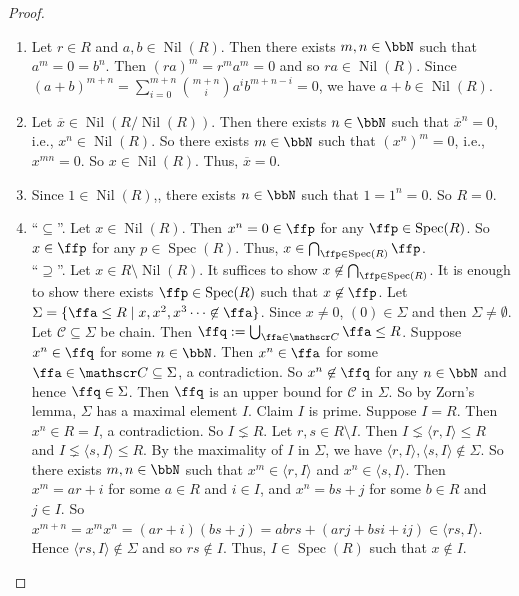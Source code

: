 \begin{proof}
    \begin{enumerate}[(1)]
        \item Let $r \in R$ and $a,b \in \operatorname{Nil}(R)$. Then there exists $m,n \in \bbN$ such that $a^m = 0 = b^n$. Then $(ra)^m = r^ma^m = 0$ and so $ra \in \operatorname{Nil}(R)$. Since $(a+b)^{m+n} = \sum_{i=0}^{m+n} \binom {m+n} i a^i b^{m+n-i} = 0$, we have $a+b \in \operatorname{Nil}(R)$.
        \item Let $\overline x \in \operatorname{Nil}(R/\operatorname{Nil}(R))$. Then there exists $n \in \bbN$ such that $\overline x^n = 0$, i.e., $x^n \in \operatorname{Nil}(R)$. So there exists $m \in \bbN$ such that $(x^n)^m = 0$, i.e., $x^{mn} = 0$. So $x \in \operatorname{Nil}(R)$. Thus, $\overline x = 0$.
        \item Since $1 \in \operatorname{Nil}(R)$,, there exists $n \in \bbN$ such that $1 = 1^n = 0$. So $R = 0$.
        \item ``$\subseteq$''. Let $x \in \operatorname{Nil}(R)$. Then $x^n = 0 \in \ffp$ for any $\ffp \in \operatorname{Spec}(R)$. So $x \in \ffp$ for any $p \in \operatorname{Spec}(R)$. Thus, $x \in \bigcap_{\ffp \in \operatorname{Spec}(R)} \ffp$. \\
            ``$\supseteq$''. Let $x \in R \setminus \operatorname{Nil}(R)$. It suffices to show $x \not \in \bigcap_{\ffp \in \operatorname{Spec}(R)}$. It is enough to show there exists $\ffp \in \operatorname{Spec}(R)$ such that $x \not \in \ffp$. Let $\Sigma = \{\ffa \leq R \mid x,x^2,x^3 \cdots \not \in \ffa\}$. Since $x \neq 0$, $(0) \in \Sigma$ and then $\Sigma \neq \emptyset$. Let $\mathscr C \subseteq \Sigma$ be chain. Then $\ffq := \bigcup_{\ffa \in \mathscr C} \ffa \leq R$. Suppose $x^n \in \ffq$ for some $n \in \bbN$. Then $x^n \in \ffa$ for some $\ffa \in \mathscr C \subseteq \Sigma$, a contradiction. So $x^n \not \in \ffq$ for any $n \in \bbN$ and hence $\ffq \in \Sigma$. Then $\ffq$ is an upper bound for $\mathscr C$ in $\Sigma$. So by Zorn's lemma, $\Sigma$ has a maximal element $I$. Claim $I$ is prime. Suppose $I = R$. Then $x^n \in R = I$, a contradiction. So $I \lneq R$. Let $r,s \in R \setminus I$. Then $I \lneq \langle r,I \rangle \leq R$ and $I \lneq \langle s,I \rangle \leq R$. By the maximality of $I$ in $\Sigma$, we have $\langle r,I \rangle, \langle s,I \rangle \not \in \Sigma$. So there exists $m,n \in \bbN$ such that $x^m \in \langle r,I \rangle$ and $x^n \in \langle s,I \rangle$. Then $x^m = ar+i$ for some $a \in R$ and $i \in I$, and $x^n = bs + j$ for some $b \in R$ and $j \in I$. So $x^{m+n} = x^m x^n = (ar+i)(bs+j) = abrs + (arj+bsi+ij) \in \langle rs,I \rangle$. Hence $\langle rs, I \rangle \not\in \Sigma$ and so $rs \not \in I$. Thus, $I \in \operatorname{Spec}(R)$ such that $x \not \in I$.
    \end{enumerate}
\end{proof}

